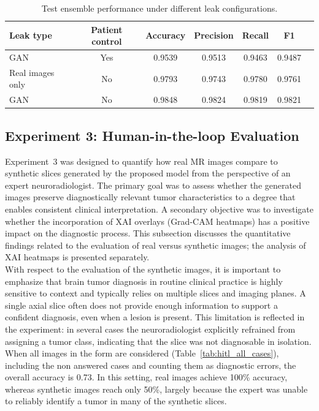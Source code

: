 \begin{table}[ht]
\centering
\caption{Test ensemble performance under different leak configurations.}
\begin{tabular}{lcccccc}
\toprule
\textbf{Leak type}        & \textbf{Patient control} & \textbf{Accuracy} & \textbf{Precision} & \textbf{Recall} & \textbf{F1} \\
\midrule
GAN         & Yes  & 0.9539 & 0.9513 & 0.9463 & 0.9487 \\
Real images only          & No   & 0.9793 & 0.9743 & 0.9780 & 0.9761 \\
GAN         & No   & 0.9848 & 0.9824 & 0.9819 & 0.9821 \\
\bottomrule
\end{tabular}
\label{tab:leak_ensemble_external}
\end{table}


\subsection{Experiment 3: Human-in-the-loop Evaluation}




Experiment~3 was designed to quantify how real MR images compare to synthetic slices generated by the proposed model from the perspective of an expert neuroradiologist. The primary goal was to assess whether the generated images preserve diagnostically relevant tumor characteristics to a degree that enables consistent clinical interpretation. A secondary objective was to investigate whether the incorporation of XAI overlays (Grad-CAM heatmaps) has a positive impact on the diagnostic process. This subsection discusses the quantitative findings related to the evaluation of real versus synthetic images; the analysis of XAI heatmaps is presented separately.\\




With respect to the evaluation of the synthetic images, it is important to emphasize that brain tumor diagnosis in routine clinical practice is highly sensitive to context and typically relies on multiple slices and imaging planes. A single axial slice often does not provide enough information to support a confident diagnosis, even when a lesion is present. This limitation is reflected in the experiment: in several cases the neuroradiologist explicitly refrained from assigning a tumor class, indicating that the slice was not diagnosable in isolation. When all images in the form are considered (Table~\ref{tab:hitl_all_cases}), including the non answered cases and counting them as diagnostic errors, the overall accuracy is 0.73. In this setting, real images achieve 100\% accuracy, whereas synthetic images reach only 50\%, largely because the expert was unable to reliably identify a tumor in many of the synthetic slices.\\

